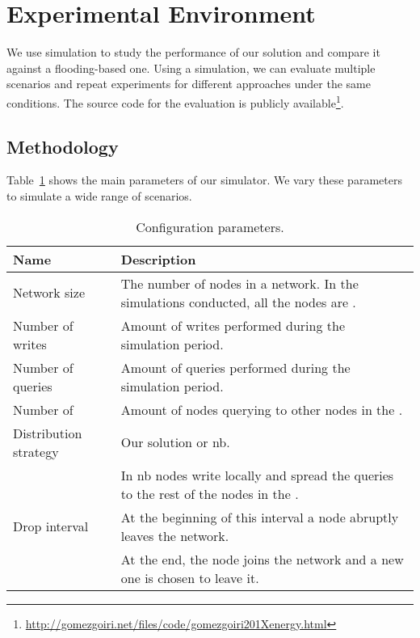 \section{Experimental Environment}
\label{environment}
We use simulation to study the performance of our solution and compare it against a flooding-based one.
Using a simulation, we can evaluate multiple scenarios and repeat experiments for different approaches under the same conditions.
The source code for the evaluation is publicly available\footnote{\url{http://gomezgoiri.net/files/code/gomezgoiri201Xenergy.html}}.

\subsection{Methodology}
Table~\ref{tab:configurationParameters} shows the main parameters of our simulator.
We vary these parameters to simulate a wide range of scenarios.


\begin{table}
  \centering
    \begin{tabular}{l p{7cm}}
      \hline
      Name & Description \\
      \hline
      Network size & The number of nodes in a network. In the simulations conducted, all the nodes are \providers{}. \\
      Number of writes & Amount of writes performed during the simulation period. \\
      Number of queries & Amount of queries performed during the simulation period. \\
      Number of \consumers{} & Amount of nodes querying to other nodes in the \Space{}. \\
      Distribution strategy & Our solution or \ac{nb}. \\
      & In \ac{nb} nodes write locally and spread the queries to the rest of the nodes in the \Space{}. \\
      Drop interval & At the beginning of this interval a node abruptly leaves the network. \\
      & At the end, the node joins the network and a new one is chosen to leave it. \\
      \hline
    \end{tabular}
    \caption {Configuration parameters.}
  \label{tab:configurationParameters}
\end{table}

